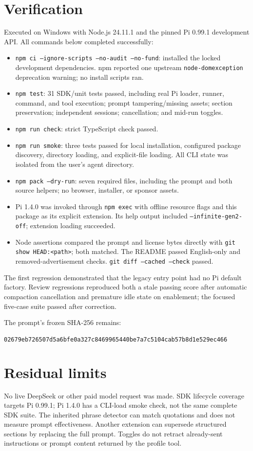 \documentclass[10pt]{ltjsarticle}
\begin{document}
\section{Verification}
Executed on Windows with Node.js 24.11.1 and the pinned Pi 0.99.1 development
API. All commands below completed successfully:
\begin{itemize}
\item \texttt{npm ci --ignore-scripts --no-audit --no-fund}: installed the
locked development dependencies. npm reported one upstream
\texttt{node-domexception} deprecation warning; no install scripts ran.
\item \texttt{npm test}: 31 SDK/unit tests passed, including real Pi loader,
runner, command, and tool execution; prompt tampering/missing assets;
section preservation; independent sessions; cancellation; and mid-run toggles.
\item \texttt{npm run check}: strict TypeScript check passed.
\item \texttt{npm run smoke}: three tests passed for local installation,
configured package discovery, directory loading, and explicit-file loading.
All CLI state was isolated from the user's agent directory.
\item \texttt{npm pack --dry-run}: seven required files, including the prompt
and both source helpers; no browser, installer, or sponsor assets.
\item Pi 1.4.0 was invoked through \texttt{npm exec} with offline resource
flags and this package as its explicit extension. Its help output included
\texttt{--infinite-gen2-off}; extension loading succeeded.
\item Node assertions compared the prompt and license bytes directly with
\texttt{git show HEAD:<path>}; both matched. The README passed English-only
and removed-advertisement checks. \texttt{git diff --cached --check} passed.
\end{itemize}
The first regression demonstrated that the legacy entry point had no Pi
default factory. Review regressions reproduced both a stale passing score
after automatic compaction cancellation and premature idle state on enablement;
the focused five-case suite passed after correction.

The prompt's frozen SHA-256 remains:\par\noindent
\texttt{02679eb726507d5a6bfe0a327c8469965440be7a7c5104cab57b8d1e529ec466}

\section{Residual limits}
No live DeepSeek or other paid model request was made. SDK lifecycle coverage
targets Pi 0.99.1; Pi 1.4.0 has a CLI-load smoke check, not the same complete
SDK suite. The inherited phrase detector can match quotations and does not
measure prompt effectiveness. Another extension can supersede structured
sections by replacing the full prompt. Toggles do not retract already-sent
instructions or prompt content returned by the profile tool.
\end{document}
